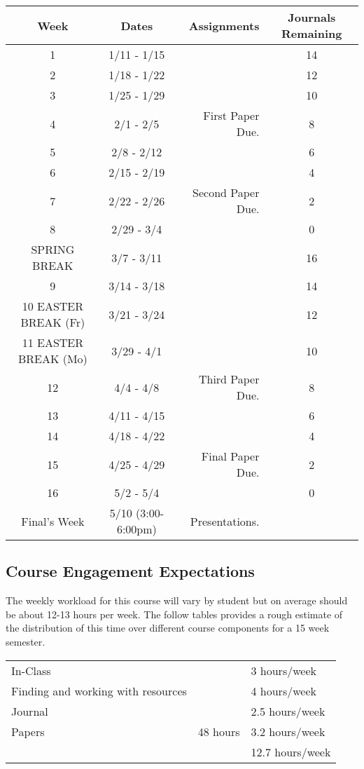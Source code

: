\documentclass[nobib]{tufte-handout}
\begin{document}
\begin{center}
\begin{tabular}{|c|c|r|c|}
\hline 
Week & Dates & Assignments & Journals Remaining\\
\hline
1 & 1/11 - 1/15 & & 14 \\
\hline
2 & 1/18 - 1/22 & & 12 \\
\hline
3 & 1/25 - 1/29 & & 10 \\
\hline
4 & 2/1 - 2/5 & First Paper Due. & 8\\
\hline
5 & 2/8 - 2/12 &  & 6\\
\hline
6 & 2/15 - 2/19 &  & 4\\
\hline
7 & 2/22 - 2/26 &  Second Paper Due. & 2 \\
\hline
8 & 2/29 - 3/4 &  & 0 \\
\hline 
SPRING BREAK & 3/7 - 3/11 &  & 16 \\
\hline
9 & 3/14 - 3/18 &  & 14\\
\hline
10 EASTER BREAK (Fr)& 3/21 - 3/24 & & 12 \\
\hline
11 EASTER BREAK (Mo)& 3/29 - 4/1 & & 10 \\
\hline
12 & 4/4 - 4/8 &  Third Paper Due. & 8 \\
\hline
13 & 4/11 - 4/15 &  & 6 \\
\hline
14 & 4/18 - 4/22 &  & 4 \\
\hline
15 & 4/25 - 4/29 & Final Paper Due. & 2\\ 
\hline
16 & 5/2 - 5/4 & & 0 \\
\hline
Final's Week & 5/10 (3:00-6:00pm) & Presentations.  &\\ 
\hline
\end{tabular}
\end{center}

\subsection{Course Engagement Expectations}

The weekly workload for this course will vary by student but on average should be about 12-13 hours per week.  The follow tables provides a rough estimate of the distribution of this time over different course components for a 15 week semester. 
\begin{center}
\begin{tabular}{|l|l|l|}
\hline
In-Class &      & 3 hours/week \\ 
Finding and working with resources &        & 4 hours/week \\
Journal &   & 2.5 hours/week \\ 
Papers & 48 hours & 3.2 hours/week \\
\hline 
& & 12.7 hours/week \\ 
\hline
\end{tabular}
\end{center}

    
\end{document}

